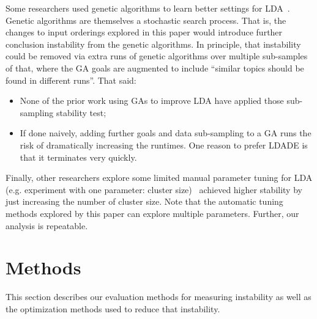 \documentclass[twocolumn,5p,sort&compress]{elsarticle}
\newcommand{\bi}{\begin{itemize}}
\newcommand{\ei}{\end{itemize}}
\theoremstyle{break}
\begin{document}
Some researchers 
used
genetic
algorithms to learn better settings for LDA~\cite{panichella2013effectively,lohar2013improving,sun2015msr4sm}.
Genetic algorithms are 
themselves a stochastic search process. That is, the changes to 
input orderings explored in this paper would introduce further conclusion instability
from the genetic algorithms.
In principle, that instability could be removed via extra  runs of genetic algorithms 
over multiple sub-samples of that, where the GA goals are augmented to include
``similar topics should be found in different runs''.
That said:
\bi
\item None of the prior work using GAs to improve LDA have applied those sub-sampling stability test;
\item If done naively, adding further goals and data sub-sampling to a GA runs the risk
  of dramatically increasing the runtimes.
One reason to prefer LDADE is that it terminates very quickly.
\ei
Finally, other researchers explore
some limited manual parameter tuning for LDA
(e.g. experiment with one parameter: cluster size)~\cite{galvis2013analysis, tian2009using}
achieved higher stability by just increasing the number of cluster size.
Note that the automatic tuning methods explored by this paper can
explore multiple parameters. Further, our analysis is repeatable.

\section{Methods}
\label{sect:evaluation}
This section describes our evaluation methods for measuring instability as well as the optimization
methods used to reduce that instability.
\end{document}
